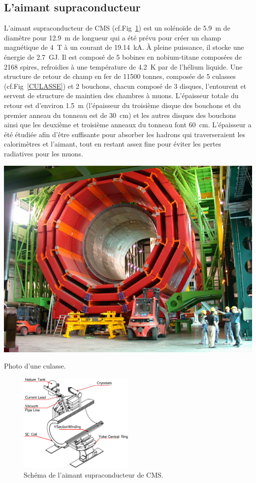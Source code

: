 \subsection{L'aimant supraconducteur}
\vspace*{-0.3cm}
L'aimant supraconducteur de CMS (cf.Fig~\ref{MAGNET}) est un solénoïde de \SI{5.9}{\meter} de diamètre pour \SI{12.9}{\meter} de longueur qui a été prévu pour créer un champ magnétique de \SI{4}{\tesla} à un courant de \SI{19.14}{\kilo\ampere}. À pleine puissance, il stocke une énergie de \SI{2.7}{\giga\joule}. Il est composé de \num{5} bobines en nobium-titane composées de \num{2168} spires, refroidies à une température de \SI{4.2}{\kelvin} par de l'hélium liquide. Une structure de retour de champ en fer de \num{11500} tonnes, composée de \num{5} culasses (cf.Fig~\ref{CULASSE}) et \num{2} bouchons, chacun composé de \num{3} disques, l'entourent et servent de structure de maintien des chambres à muons. L'épaisseur totale du retour est d'environ \SI{1.5}{\meter} (l'épaisseur du troisième disque des bouchons et du premier anneau du tonneau est de \SI{30}{\centi\meter}) et les autres disques des bouchons ainsi que les deuxième et troisième anneaux du tonneau font \SI{60}{\centi\meter}. L'épaisseur a été étudiée afin d'être suffisante pour absorber les hadrons qui traverseraient les calorimètres et l'aimant, tout en restant assez fine pour éviter les pertes radiatives pour les muons.
\marginpar
{
	\centering
	\includegraphics[width=\marginparwidth]{CMS/CULASSE.jpg}
	\captionsetup{type=figure}\caption{Photo d'une culasse.}
	\label{CULASSE}
}
\begin{figure}[ht!]
	\centering
	\includegraphics[width=0.50\textwidth]{CMS/MAGNET.png}
	\captionsetup{type=figure}\caption{Schéma de l'aimant supraconducteur de CMS.}
	\label{MAGNET}
\end{figure}
